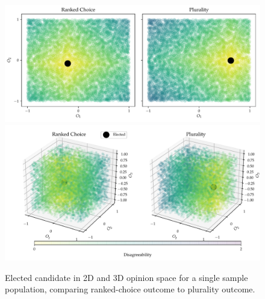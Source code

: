 \begin{figure}
\includegraphics[width=1\textwidth]{../src/figs/uniform_opinions/rc-gen_anecdotal_comparison-2D.pdf}\vspace{-3mm}
\includegraphics[width=1\textwidth]{../src/figs/uniform_opinions/rc-gen_anecdotal_comparison-3D.pdf}
\caption{Elected candidate in 2D and 3D opinion space for a single sample population, comparing ranked-choice outcome to plurality outcome.}
\label{fig:plurality_vs_rc_anecdotal}
\end{figure}
